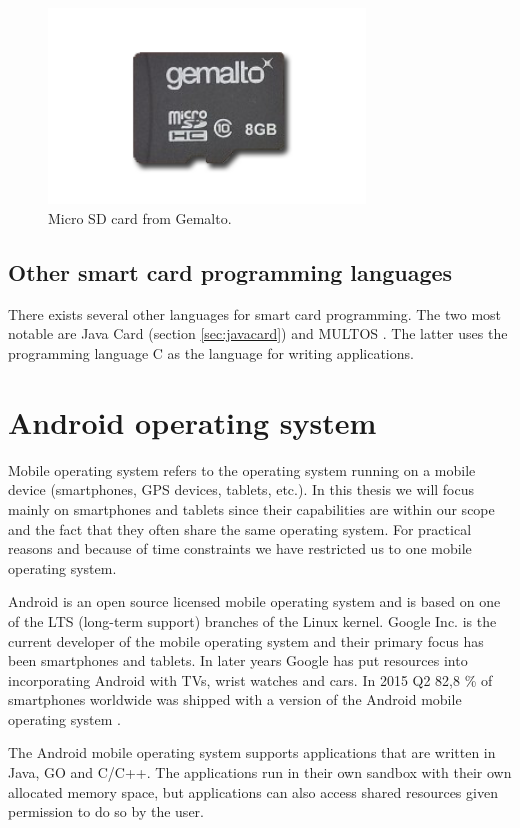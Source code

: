 \begin{figure}[h!]
  \caption{Micro SD card from Gemalto.}
  \label{fig:msdcard}
  \centering
    \includegraphics[width=0.75\textwidth]{images/msd.png}
\end{figure}


\subsection{Other smart card programming languages}
There exists several other languages for smart card programming. The two most notable are Java Card (section \ref{sec:javacard}) and MULTOS \cite{multos}. The latter uses the programming language C as the language for writing applications.

\section{Android operating system}
Mobile operating system refers to the operating system running on a mobile device (smartphones, GPS devices, tablets, etc.). In this thesis we will focus mainly on smartphones and tablets since their capabilities are within our scope and the fact that they often share the same operating system. For practical reasons and because of time constraints we have restricted us to one mobile operating system.

Android is an open source licensed mobile operating system and is based on one of the LTS (long-term support) branches of the Linux kernel. Google Inc. \cite{google} is the current developer of the mobile operating system and their primary focus has been smartphones and tablets. In later years Google has put resources into incorporating Android with TVs, wrist watches and cars. In 2015 Q2 82,8 \% of smartphones worldwide was shipped with a version of the Android mobile operating system \cite{androidMarketShare}.

The Android mobile operating system supports applications that are written in Java, GO and C/C++. The applications run in their own sandbox with their own allocated memory space, but applications can also access shared resources given permission to do so by the user.

